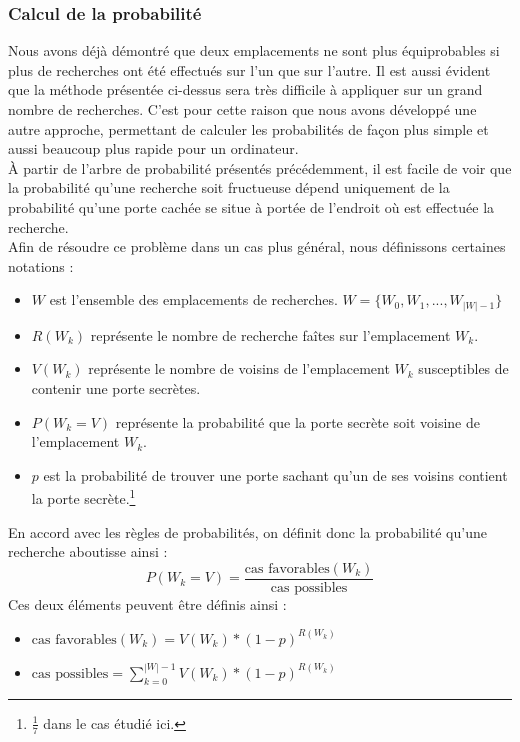 \documentclass[a4paper,12pt]{article}
\begin{document}
\subsubsection{Calcul de la probabilité}
Nous avons déjà démontré que deux emplacements ne sont plus équiprobables si
plus de recherches ont été effectués sur l'un que sur l'autre. Il est aussi
évident que la méthode présentée ci-dessus sera très difficile à appliquer sur
un grand nombre de recherches. C'est pour cette raison que nous avons développé
une autre approche, permettant de calculer les probabilités de façon plus simple
et aussi beaucoup plus rapide pour un ordinateur.\\
À partir de l'arbre de probabilité présentés précédemment, il est facile de voir
que la probabilité qu'une recherche soit fructueuse dépend uniquement de la
probabilité qu'une porte cachée se situe à portée de l'endroit où est effectuée
la recherche.
\\
Afin de résoudre ce problème dans un cas plus général, nous définissons
certaines notations :
\begin{itemize}
\item $W$ est l'ensemble des emplacements de recherches.
  $W = \{W_0,W_1, ... , W_{|W| -1} \}$
\item $R(W_k)$ représente le nombre de recherche faîtes sur l'emplacement $W_k$.
\item $V(W_k)$ représente le nombre de voisins de l'emplacement $W_k$
  susceptibles de contenir une porte secrètes.
\item $P(W_k = V)$ représente la probabilité que la porte secrète soit voisine
  de l'emplacement $W_k$.
\item $p$ est la probabilité de trouver une porte sachant qu'un de ses voisins
  contient la porte secrète.\footnote{$\frac{1}{7}$ dans le cas étudié ici.}
\end{itemize}

En accord avec les règles de probabilités, on définit donc la probabilité
qu'une recherche aboutisse ainsi :
$$P(W_k = V) = \frac{\text{cas favorables}(W_k)}{\text{cas possibles}}$$
Ces deux éléments peuvent être définis ainsi :
\begin{itemize}
\item $\text{cas favorables}(W_k) = V(W_k) * (1-p)^{R(W_k)}$
\item $\text{cas possibles} = \sum\limits_{k=0}^{|W| - 1}{V(W_k) * (1-p)^{R(W_k)}}$
\end{itemize}
\end{document}
